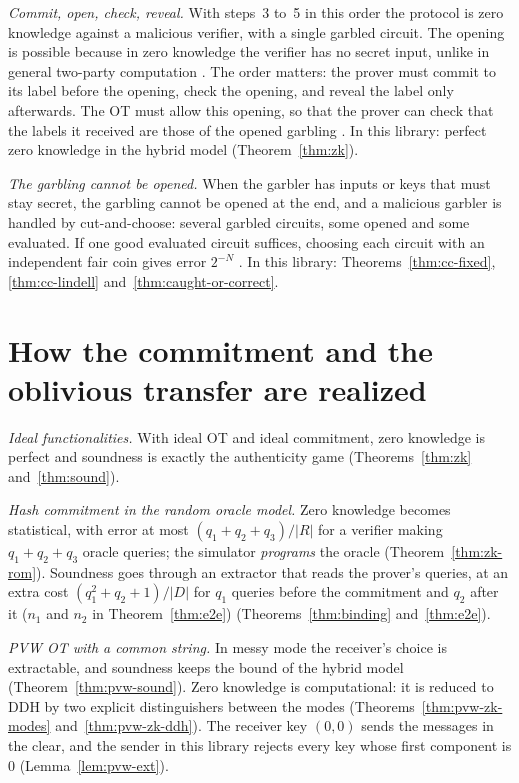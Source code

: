 \emph{Commit, open, check, reveal.} With steps~3 to~5 in this order the protocol is zero knowledge
against a malicious verifier, with a single garbled circuit. The opening is possible because in zero
knowledge the verifier has no secret input, unlike in general two-party computation
\cite[Sect.~1]{JKO13}. The order matters: the prover must commit to its label before the opening,
check the opening, and reveal the label only afterwards. The OT must allow this opening, so that the
prover can check that the labels it received are those of the opened garbling
\cite[Sect.~1.1]{JKO13}. In this library: perfect zero knowledge in the hybrid model
(Theorem~\ref{thm:zk}).

\emph{The garbling cannot be opened.} When the garbler has inputs or keys that must stay secret, the
garbling cannot be opened at the end, and a malicious garbler is handled by cut-and-choose: several
garbled circuits, some opened and some evaluated. If one good evaluated circuit suffices, choosing
each circuit with an independent fair coin gives error $2^{-N}$ \cite{Lin13}. In this library:
Theorems~\ref{thm:cc-fixed}, \ref{thm:cc-lindell} and~\ref{thm:caught-or-correct}.

\section{How the commitment and the oblivious transfer are realized}

\emph{Ideal functionalities.} With ideal OT and ideal commitment, zero knowledge is perfect and
soundness is exactly the authenticity game (Theorems~\ref{thm:zk} and~\ref{thm:sound}).

\emph{Hash commitment in the random oracle model.} Zero knowledge becomes statistical, with error
at most $(q_1+q_2+q_3)/|R|$ for a verifier making $q_1+q_2+q_3$ oracle queries; the simulator
\emph{programs} the oracle (Theorem~\ref{thm:zk-rom}). Soundness goes through an extractor that
reads the prover's queries, at an extra cost $(q_1^2+q_2+1)/|D|$ for $q_1$ queries before the
commitment and $q_2$ after it ($n_1$ and $n_2$ in Theorem~\ref{thm:e2e}) (Theorems~\ref{thm:binding}
and~\ref{thm:e2e}).

\emph{PVW OT with a common string.} In messy mode the receiver's choice is extractable, and
soundness keeps the bound of the hybrid model (Theorem~\ref{thm:pvw-sound}). Zero knowledge is
computational: it is reduced to DDH by two explicit distinguishers between the modes
(Theorems~\ref{thm:pvw-zk-modes} and~\ref{thm:pvw-zk-ddh}). The receiver key $(0, 0)$ sends the messages in the
clear, and the sender in this library rejects every key whose first component is $0$
(Lemma~\ref{lem:pvw-ext}).


